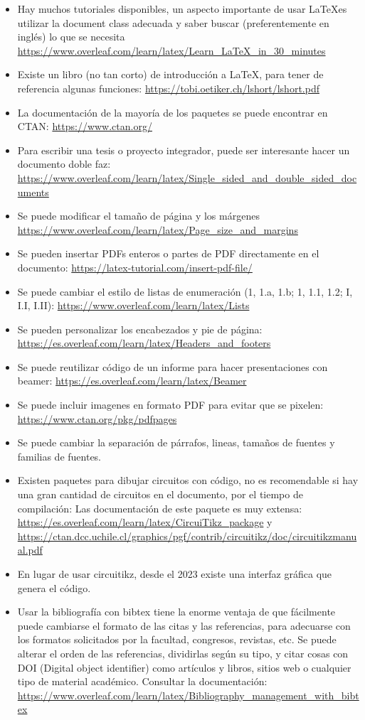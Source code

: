 \begin{itemize}
    
    \item Hay muchos tutoriales disponibles, un aspecto importante de usar \LaTeX es utilizar la document class adecuada y saber buscar (preferentemente en inglés) lo que se necesita \url{https://www.overleaf.com/learn/latex/Learn_LaTeX_in_30_minutes}
    \item Existe un libro (no tan corto) de introducción a \LaTeX, para tener de referencia algunas funciones: \url{https://tobi.oetiker.ch/lshort/lshort.pdf}
    \item La documentación de la mayoría de los paquetes se puede encontrar en CTAN: \url{https://www.ctan.org/}
    \item Para escribir una tesis o proyecto integrador, puede ser interesante hacer un documento doble faz: \url{https://www.overleaf.com/learn/latex/Single_sided_and_double_sided_documents}
    \item Se puede modificar el tamaño de página y los márgenes \url{https://www.overleaf.com/learn/latex/Page_size_and_margins}
    \item Se pueden insertar PDFs enteros o partes de PDF directamente en el documento: \url{https://latex-tutorial.com/insert-pdf-file/}
    \item Se puede cambiar el estilo de listas de enumeración (1, 1.a, 1.b; 1, 1.1, 1.2; I, I.I, I.II): \url{https://www.overleaf.com/learn/latex/Lists}
    \item Se pueden personalizar los encabezados y pie de página: \url{https://es.overleaf.com/learn/latex/Headers_and_footers}
    \item Se puede reutilizar código de un informe para hacer presentaciones con beamer: \url{https://es.overleaf.com/learn/latex/Beamer}
    \item Se puede incluir imagenes en formato PDF para evitar que se pixelen: \url{https://www.ctan.org/pkg/pdfpages}
    \item Se puede cambiar la separación de párrafos, lineas, tamaños de fuentes y familias de fuentes.
    \item Existen paquetes para dibujar circuitos con código, no es recomendable si hay una gran cantidad de circuitos en el documento, por el tiempo de compilación: Las documentación de este paquete es muy extensa: \url{https://es.overleaf.com/learn/latex/CircuiTikz_package} y \url{https://ctan.dcc.uchile.cl/graphics/pgf/contrib/circuitikz/doc/circuitikzmanual.pdf}
    \item En lugar de usar circuitikz, desde el 2023 existe una interfaz gráfica que genera el código.
    \item Usar la bibliografía con bibtex tiene la enorme ventaja de que fácilmente puede cambiarse el formato de las citas y las referencias, para adecuarse con los formatos solicitados por la facultad, congresos, revistas, etc. Se puede alterar el orden de las referencias, dividirlas según su tipo, y citar cosas con DOI (Digital object identifier) como artículos y libros, sitios web o cualquier tipo de material académico. Consultar la documentación: \url{https://www.overleaf.com/learn/latex/Bibliography_management_with_bibtex}
\end{itemize}

